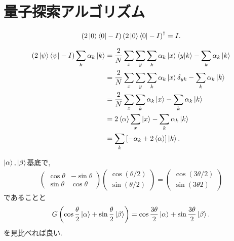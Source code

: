 \chapter{量子探索アルゴリズム}

\begin{ex}
    \label{ex6.1}
    \begin{align*}
        \left( 2 \ket{0} \bra{0} - I \right)
        \left( 2 \ket{0} \bra{0} - I \right)^\dagger
        =
        I.
    \end{align*}
\end{ex}


\begin{ex}
    \label{ex6.2}
    \begin{align*}
        \left( 2 \ket{\psi} \bra{\psi} - I \right) \sum_k \alpha_k \ket{k}
         & =
        \frac{2}{N} \sum_x \sum_y \sum_k \alpha_k \ket{x} \braket{y|k}- \sum_k \alpha_k \ket{k}
        \\
         & =
        \frac{2}{N} \sum_x \sum_y \sum_k \alpha_k \ket{x}
        \delta_{yk}- \sum_k \alpha_k \ket{k}
        \\
         & =
        \frac{2}{N} \sum_x \sum_k \alpha_k \ket{x}- \sum_k \alpha_k \ket{k}
        \\
         & =
        2 \braket{\alpha} \sum_x \ket{x} - \sum_k \alpha_k \ket{k}
        \\
         & =
        \sum_k  \left[- \alpha_k + 2 \braket{\alpha} \right] \ket{k}.
    \end{align*}
\end{ex}

\begin{ex}
    \label{ex6.3}

    $\ket{\alpha}, \ket{\beta}$基底で,
    \begin{align*}
        \begin{pmatrix}
            \cos \theta & - \sin \theta \\
            \sin \theta & \cos \theta
        \end{pmatrix}
        \begin{pmatrix}
            \cos (\theta/2) \\
            \sin (\theta/2)
        \end{pmatrix}
        =
        \begin{pmatrix}
            \cos (3\theta/2) \\
            \sin (3\theta2)
        \end{pmatrix}
    \end{align*}
    であることと
    \begin{align*}
        G \left( \cos \frac{\theta}{2}\ket{\alpha} + \sin \frac{\theta}{2} \ket{\beta}\right)
        =
        \cos \frac{3\theta}{2}\ket{\alpha} + \sin \frac{3\theta}{2} \ket{\beta}.
    \end{align*}
    を見比べれば良い.
\end{ex}

